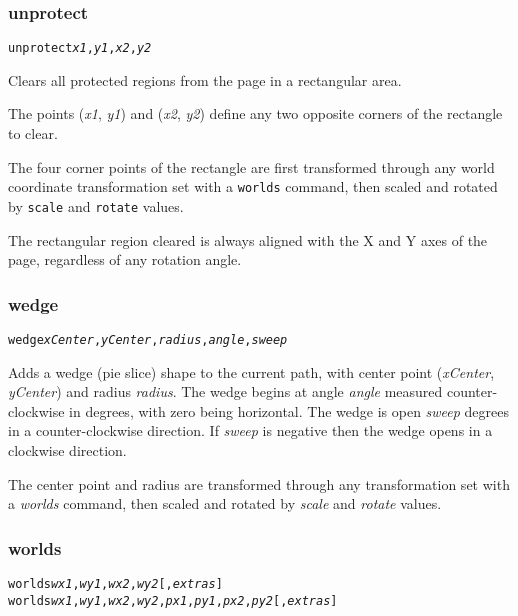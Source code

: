 \subsubsection{unprotect}

\begin{alltt}
unprotect \textit{x1}, \textit{y1}, \textit{x2}, \textit{y2}
\end{alltt}

Clears all protected regions from the page in a rectangular
area.

The points
(\textit{x1}, \textit{y1}) and (\textit{x2}, \textit{y2}) define
any two opposite corners of the rectangle to clear.

The four corner points of the rectangle
are first transformed through any world coordinate
transformation set with a \texttt{worlds} command,
then scaled and rotated by \texttt{scale}
and \texttt{rotate} values.

The rectangular region cleared is always aligned with the X
and Y axes of the page, regardless of any rotation angle.

\subsubsection{wedge}

\begin{alltt}
wedge \textit{xCenter}, \textit{yCenter}, \textit{radius}, \textit{angle}, \textit{sweep}
\end{alltt}

Adds a wedge (pie slice) shape to the current path, with center
point (\textit{xCenter}, \textit{yCenter}) and radius
\textit{radius}.
The wedge begins at angle \textit{angle} measured
counter-clockwise in degrees, with zero being horizontal.
The wedge is open \textit{sweep} degrees in a counter-clockwise direction.
If \textit{sweep} is negative then the wedge opens in a clockwise direction.

The center point and radius are transformed through any
transformation set with a \textit{worlds} command,
then scaled and rotated by \textit{scale}
and \textit{rotate} values.

\subsubsection{worlds}

\begin{alltt}
worlds \textit{wx1}, \textit{wy1}, \textit{wx2}, \textit{wy2} [, \textit{extras} ]
worlds \textit{wx1}, \textit{wy1}, \textit{wx2}, \textit{wy2}, \textit{px1}, \textit{py1}, \textit{px2}, \textit{py2} [, \textit{extras} ]
\end{alltt}

